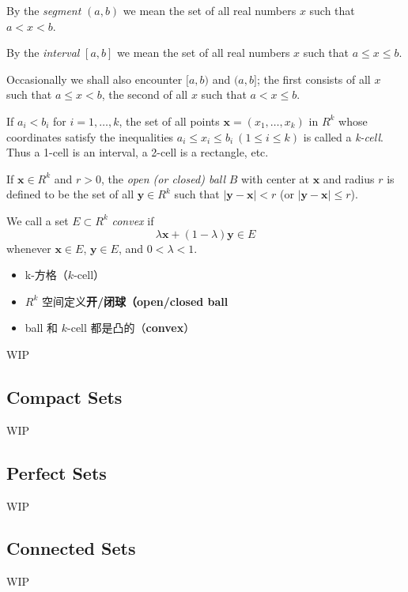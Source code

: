 \documentclass[../poma-notes.tex]{subfiles}
\begin{document}
\begin{definition}
  By the \textit{segment} $(a, b)$ we mean the set of all real numbers $x$ such that $a < x < b$.

  By the \textit{interval} $[a, b]$ we mean the set of all real numbers $x$ such that $a \le x \le b$.

  Occasionally we shall also encounter  $[a, b)$ and $(a, b]$; the first consists of all $x$
  such that $a \le x < b$, the second of all $x$ such that $a < x \le b$.

  If $a_i < b_i$ for $i=1,\dots,k$, the set of all points $\mathbf{x} = (x_1,\dots,x_k)$ in $R^k$ whose coordinates
  satisfy the inequalities $a_i \le x_i \le b_i \ (1 \le i \le k)$ is called a \textit{k-cell}. Thus a 1-cell is an
  interval, a 2-cell is a rectangle, etc.

  If $\mathbf{x} \in R^k$ and $r>0$, the \textit{open (or closed) ball} $B$ with center at $\mathbf{x}$ and radius $r$
  is defined to be the set of all $\mathbf{y} \in R^k$ such that $|\mathbf{y}-\mathbf{x}|<r$ (or
  $|\mathbf{y}-\mathbf{x}| \le r$).

  We call a set $E \subset R^k$ \textit{convex} if
  \[\lambda\mathbf{x}+(1-\lambda)\mathbf{y} \in E\]
  whenever $\mathbf{x} \in E$, $\mathbf{y} \in E$, and $0<\lambda<1$.
\end{definition}

\begin{anote}
  \begin{itemize}
    \item k-方格（$k$-cell）
    \item $R^k$ 空间定义\textbf{开/闭球（open/closed ball}
    \item ball 和 $k$-cell 都是凸的（\textbf{convex}）
  \end{itemize}
\end{anote}

WIP

\subsection*{Compact Sets}

WIP

\subsection*{Perfect Sets}

WIP

\subsection*{Connected Sets}

WIP
\end{document}
